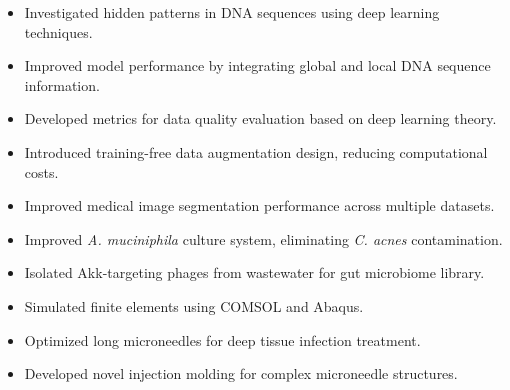\documentclass{resume}
\begin{document}
\begin{itemize}
	\item Investigated hidden patterns in DNA sequences using deep learning techniques.
	\item Improved model performance by integrating global and local DNA sequence information.
\end{itemize}

\begin{itemize}
	\item Developed metrics for data quality evaluation based on deep learning theory.
	\item Introduced training-free data augmentation design, reducing computational costs.
	\item Improved medical image segmentation performance across multiple datasets.
\end{itemize}

\begin{itemize}
	\item Improved \textit{A. muciniphila} culture system, eliminating \textit{C. acnes} contamination.
	\item Isolated Akk-targeting phages from wastewater for gut microbiome library.
\end{itemize}

\begin{itemize}
	\item Simulated finite elements using COMSOL and Abaqus.
	\item Optimized long microneedles for deep tissue infection treatment.
	\item Developed novel injection molding for complex microneedle structures.
\end{itemize}
\end{document}
